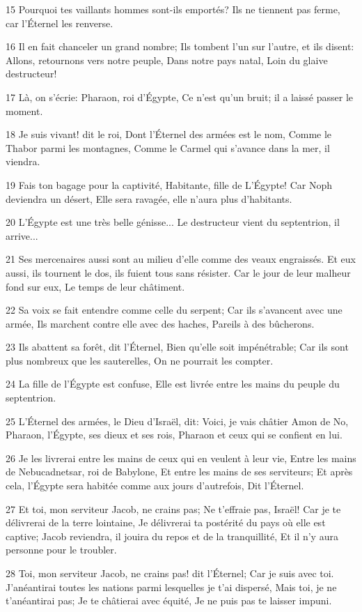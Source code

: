 \par 15 Pourquoi tes vaillants hommes sont-ils emportés? Ils ne tiennent pas ferme, car l'Éternel les renverse.
\par 16 Il en fait chanceler un grand nombre; Ils tombent l'un sur l'autre, et ils disent: Allons, retournons vers notre peuple, Dans notre pays natal, Loin du glaive destructeur!
\par 17 Là, on s'écrie: Pharaon, roi d'Égypte, Ce n'est qu'un bruit; il a laissé passer le moment.
\par 18 Je suis vivant! dit le roi, Dont l'Éternel des armées est le nom, Comme le Thabor parmi les montagnes, Comme le Carmel qui s'avance dans la mer, il viendra.
\par 19 Fais ton bagage pour la captivité, Habitante, fille de L'Égypte! Car Noph deviendra un désert, Elle sera ravagée, elle n'aura plus d'habitants.
\par 20 L'Égypte est une très belle génisse... Le destructeur vient du septentrion, il arrive...
\par 21 Ses mercenaires aussi sont au milieu d'elle comme des veaux engraissés. Et eux aussi, ils tournent le dos, ils fuient tous sans résister. Car le jour de leur malheur fond sur eux, Le temps de leur châtiment.
\par 22 Sa voix se fait entendre comme celle du serpent; Car ils s'avancent avec une armée, Ils marchent contre elle avec des haches, Pareils à des bûcherons.
\par 23 Ils abattent sa forêt, dit l'Éternel, Bien qu'elle soit impénétrable; Car ils sont plus nombreux que les sauterelles, On ne pourrait les compter.
\par 24 La fille de l'Égypte est confuse, Elle est livrée entre les mains du peuple du septentrion.
\par 25 L'Éternel des armées, le Dieu d'Israël, dit: Voici, je vais châtier Amon de No, Pharaon, l'Égypte, ses dieux et ses rois, Pharaon et ceux qui se confient en lui.
\par 26 Je les livrerai entre les mains de ceux qui en veulent à leur vie, Entre les mains de Nebucadnetsar, roi de Babylone, Et entre les mains de ses serviteurs; Et après cela, l'Égypte sera habitée comme aux jours d'autrefois, Dit l'Éternel.
\par 27 Et toi, mon serviteur Jacob, ne crains pas; Ne t'effraie pas, Israël! Car je te délivrerai de la terre lointaine, Je délivrerai ta postérité du pays où elle est captive; Jacob reviendra, il jouira du repos et de la tranquillité, Et il n'y aura personne pour le troubler.
\par 28 Toi, mon serviteur Jacob, ne crains pas! dit l'Éternel; Car je suis avec toi. J'anéantirai toutes les nations parmi lesquelles je t'ai dispersé, Mais toi, je ne t'anéantirai pas; Je te châtierai avec équité, Je ne puis pas te laisser impuni.

